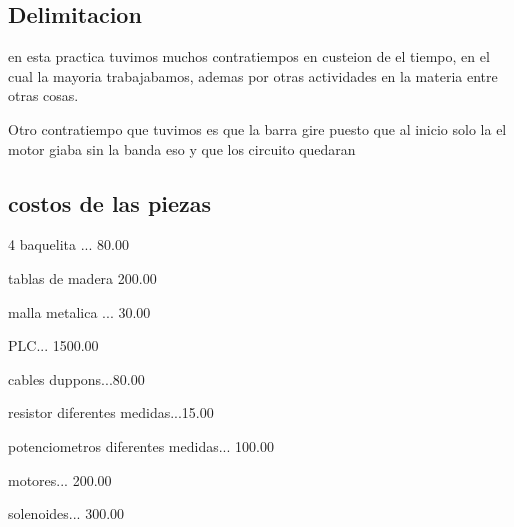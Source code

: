 \documentclass[12pt,a4paper]{article}
\begin{document}
\subsection{Delimitacion}
\begin{flushleft}
en esta practica tuvimos muchos contratiempos en custeion de el tiempo, en el cual la mayoria trabajabamos, ademas por otras actividades en la materia entre otras cosas. 
\end{flushleft}
\begin{flushleft}
Otro contratiempo que tuvimos es que la barra gire  puesto que al inicio solo la el motor giaba sin la banda eso y que los circuito quedaran 
\end{flushleft}
\begin{flushleft}
\subsection{costos de las piezas}

4 baquelita ... 80.00
\end{flushleft}
\begin{flushleft}
tablas de madera 200.00
\end{flushleft}
\begin{flushleft}
malla metalica ... 30.00

\end{flushleft}
\begin{flushleft}
PLC... 1500.00

\end{flushleft}
\begin{flushleft}
cables duppons...80.00
\end{flushleft}
\begin{flushleft}
resistor diferentes medidas...15.00
\end{flushleft}
\begin{flushleft}
potenciometros diferentes medidas... 100.00
\end{flushleft}
\begin{flushleft}
motores... 200.00
\end{flushleft}
\begin{flushleft}
solenoides... 300.00
\end{flushleft}
\end{document}
